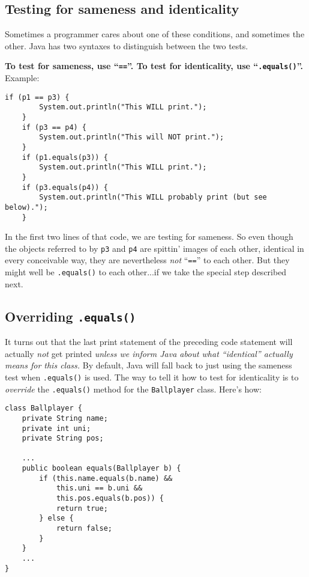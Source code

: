 \subsection{Testing for sameness and identicality}

Sometimes a programmer cares about one of these conditions, and sometimes the
other. Java has two syntaxes to distinguish between the two tests.

\textbf{To test for sameness, use ``\texttt{==}''. To test for identicality, use
``\texttt{.equals()}''.} Example:

\begin{Verbatim}[fontsize=\small,samepage=true,frame=single]
    if (p1 == p3) {
        System.out.println("This WILL print.");
    }
    if (p3 == p4) {
        System.out.println("This will NOT print.");
    }
    if (p1.equals(p3)) {
        System.out.println("This WILL print.");
    }
    if (p3.equals(p4)) {
        System.out.println("This WILL probably print (but see below).");
    }
\end{Verbatim}

In the first two lines of that code, we are testing for sameness. So even
though the objects referred to by \texttt{p3} and \texttt{p4} are spittin'
images of each other, identical in every conceivable way, they are
nevertheless \textit{not} ``\texttt{==}'' to each other. But they might well be
\texttt{.equals()} to each other...if we take the special step described next.

\subsection{Overriding \texttt{.equals()}}

It turns out that the last print statement of the preceding code statement
will actually \textit{not} get printed \textit{unless we inform Java about
what ``identical'' actually means for this class.} By default, Java will fall
back to just using the sameness test when \texttt{.equals()} is used. The way
to tell it how to test for identicality is to \textit{override} the
\texttt{.equals()} method for the \texttt{Ballplayer} class. Here's how:

\begin{Verbatim}[fontsize=\footnotesize,samepage=true,frame=single]
class Ballplayer {
    private String name;
    private int uni;
    private String pos;
    
    ...
    public boolean equals(Ballplayer b) {
        if (this.name.equals(b.name) &&
            this.uni == b.uni &&
            this.pos.equals(b.pos)) {
            return true;
        } else {
            return false;
        }
    }
    ...
}
\end{Verbatim}

